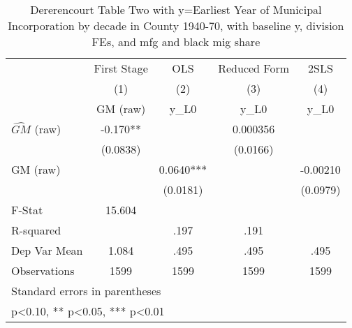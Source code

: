 \begin{table}[htbp]\centering
\def\sym#1{\ifmmode^{#1}\else\(^{#1}\)\fi}
\caption{Dererencourt Table Two with y=Earliest Year of Municipal Incorporation by decade in County 1940-70, with baseline y, division FEs, and mfg and black mig share}
\begin{tabular}{l*{4}{c}}
\toprule
                    & First Stage   &         OLS   &Reduced Form   &        2SLS   \\
                    &\multicolumn{1}{c}{(1)}&\multicolumn{1}{c}{(2)}&\multicolumn{1}{c}{(3)}&\multicolumn{1}{c}{(4)}\\
                    &\multicolumn{1}{c}{GM  (raw)}&\multicolumn{1}{c}{y\_L0}&\multicolumn{1}{c}{y\_L0}&\multicolumn{1}{c}{y\_L0}\\
\midrule
$\hat{GM}$ (raw)    &      -0.170** &               &    0.000356   &               \\
                    &    (0.0838)   &               &    (0.0166)   &               \\
\addlinespace
GM  (raw)           &               &      0.0640***&               &    -0.00210   \\
                    &               &    (0.0181)   &               &    (0.0979)   \\
\midrule
F-Stat              &      15.604   &               &               &               \\
R-squared           &               &        .197   &        .191   &               \\
Dep Var Mean        &       1.084   &        .495   &        .495   &        .495   \\
Observations        &        1599   &        1599   &        1599   &        1599   \\
\bottomrule
\multicolumn{5}{l}{\footnotesize Standard errors in parentheses}\\
\multicolumn{5}{l}{\footnotesize * p<0.10, ** p<0.05, *** p<0.01}\\
\end{tabular}
\end{table}
